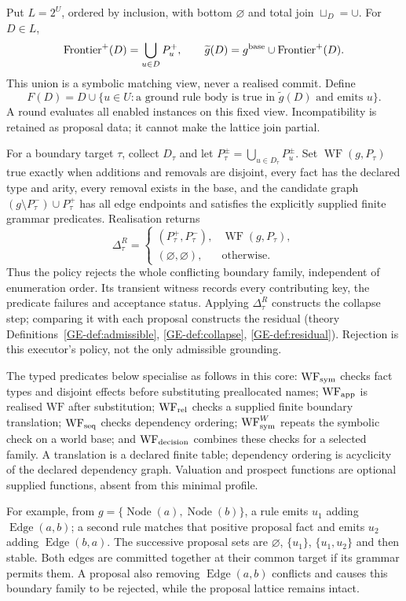 \documentclass[11pt,a4paper]{article}
\theoremstyle{remark}
\begin{document}
Put $L=2^U$, ordered by inclusion, with bottom $\varnothing$ and total
join $\sqcup_D=\cup$. For $D\in L$,
\[
\operatorname{Frontier}^+(D)=\bigcup_{u\in D}P_u^+,
\qquad
\widetilde g(D)=g^{\rm base}\cup\operatorname{Frontier}^+(D).
\]
This union is a symbolic matching view, never a realised commit. Define
\[
F(D)=D\cup\{u\in U:\text{a ground rule body is true in }
                   \widetilde g(D)\text{ and emits }u\}.
\]
A round evaluates all enabled instances on this fixed view. Incompatibility
is retained as proposal data; it cannot make the lattice join partial.

For a boundary target $\tau$, collect $D_\tau$ and let
$P_\tau^\pm=\bigcup_{u\in D_\tau}P_u^\pm$. Set
$\operatorname{WF}(g,P_\tau)$ true exactly when additions and removals are
disjoint, every fact has the declared type and arity, every removal exists
in the base, and the candidate graph
$(g\setminus P_\tau^-)\cup P_\tau^+$ has all edge endpoints and satisfies
the explicitly supplied finite grammar predicates. Realisation returns
\[
\Delta_\tau^R=
\begin{cases}(P_\tau^+,P_\tau^-),&\operatorname{WF}(g,P_\tau),\\
(\varnothing,\varnothing),&\text{otherwise}.
\end{cases}
\]
Thus the policy rejects the whole conflicting boundary family, independent
of enumeration order. Its transient witness records every contributing key,
the predicate failures and acceptance status. Applying $\Delta_\tau^R$
constructs the collapse step; comparing it with each proposal constructs
the residual (theory Definitions~\ref{GE-def:admissible},
\ref{GE-def:collapse}, \ref{GE-def:residual}). Rejection is this executor's
policy, not the only admissible grounding.

The typed predicates below specialise as follows in this core:
$\mathrm{WF}_{\rm sym}$ checks fact types and disjoint effects before
substituting preallocated names; $\mathrm{WF}_{\rm app}$ is realised
$\mathrm{WF}$ after substitution; $\mathrm{WF}_{\rm rel}$ checks a supplied
finite boundary translation; $\mathrm{WF}_{\rm seq}$ checks dependency
ordering; $\mathrm{WF}_{\rm sym}^W$ repeats the symbolic check on a world
base; and $\mathrm{WF}_{\rm decision}$ combines these checks for a selected
family. A translation is a declared finite table; dependency ordering is
acyclicity of the declared dependency graph. Valuation and prospect functions
are optional supplied functions, absent from this minimal profile.

For example, from $g=\{\operatorname{Node}(a),\operatorname{Node}(b)\}$,
a rule emits $u_1$ adding $\operatorname{Edge}(a,b)$; a second rule matches
that positive proposal fact and emits $u_2$ adding
$\operatorname{Edge}(b,a)$. The successive proposal sets are
$\varnothing$, $\{u_1\}$, $\{u_1,u_2\}$ and then stable. Both edges
are committed together at their common target if its grammar permits them.
A proposal also removing $\operatorname{Edge}(a,b)$ conflicts and causes
this boundary family to be rejected, while the proposal lattice remains intact.
\end{document}
